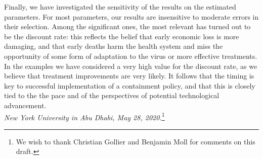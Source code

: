 \documentclass{amsart}
\begin{document}
\begin{comment}
procedure apparently adopted by very few countries,
possibly Germany and Sweden;
by selecting the appropriate level, one can achieve a
reproduction number stabilized around $1$, a mortality
reduction of  around $75\%$, but with an annual 
GDP loss of about $20\%$:
the perceived welfare measured by the loss
functional is still quite high.
Then, we have considered a single reopening after a 
drastic, initial lockdown, a strategy adopted by most countries;
the achieved mortality reduction is lower (at around $40\%$),
but with less GDP loss (an annual $12\%$), since
the outbreak is allowed to mildly restart after the first lockdown;
the perceived welfare is less, as GDP loss occurs at the
early stages. The trend continues with more successive
lockdowns followed by  reopenings,
a situation many countries could encounter if reopenings
end up reigniting the outbreak; in these scenarios, the GDP loss is further contained, but at the price of more deaths
and less overall welfare. 

The third conclusion of our study is somewhat 
paradoxical: earlier sharp interventions, apparently
aimed at saving lives with moderate consideration
of the economy, being forced to drastic reopenings
to limit economic damages,
end up producing more deaths and a more contained
GDP loss, with overall decreased welfare with respect to 
more planned options. This result might not apply to all contexts, but sheds some light on the trade-offs involved, and suggests that gradual policies of longer duration but more moderate containments have large benefits.
\end{comment}


\medskip
Finally, we have investigated the sensitivity of the
results on the estimated parameters. For most parameters,
our results are insensitive to moderate errors 
in their selection. Among the significant ones, the
most relevant has turned out
to be the discount rate: this reflects the belief that
early economic loss is more damaging, and that early deaths
 harm the health system and miss the opportunity of
 some form of adaptation to the virus or
 more effective treatments. In the
 examples we have considered a very high
 value for the discount rate, as we believe that 
treatment improvements are very likely.
It follows that  the timing is key to successful implementation of a containment policy, and that this is
 closely tied to the
 the pace and of the perspectives of potential technological advancement.
 \\
\newline
\newline
\textit{New York University in Abu Dhabi, May 28, 2020.}\footnote{ We wish to thank Christian Gollier and Benjamin Moll for comments on this draft.}
 \color{black}
 
\end{document}
